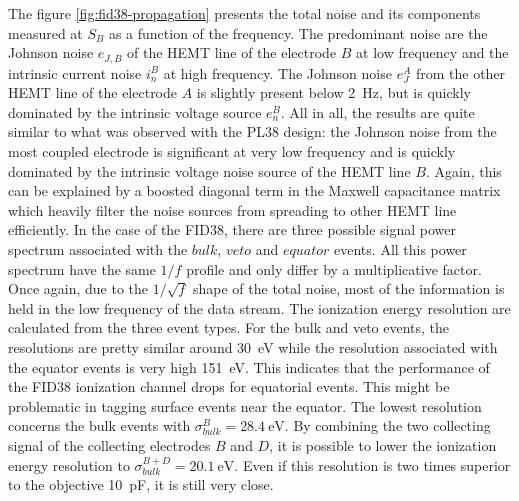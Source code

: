 The figure \ref{fig:fid38-propagation} presents the total noise and its components measured at $S_B$ as a function of the frequency. The predominant noise are the Johnson noise $e_{J,B}$ of the HEMT line of the electrode $B$ at low frequency and the intrinsic current noise $i_n^B$ at high frequency. The Johnson noise $e_J^A$ from the other HEMT line of the electrode $A$ is slightly present below \SI{2}{\Hz}, but is quickly dominated by the intrinsic voltage source $e_n^B$. All in all, the results are quite similar to what was observed with the PL38 design: the Johnson noise from the most coupled electrode is significant at very low frequency and is quickly dominated by the intrinsic voltage noise source of the HEMT line $B$. Again, this can be explained by a boosted diagonal term in the Maxwell capacitance matrix which heavily filter the noise sources from spreading to other HEMT line efficiently.
In the case of the FID38, there are three possible signal power spectrum associated with the $bulk$, $veto$ and $equator$ events. All this power spectrum have the same $1/f$ profile and only differ by a multiplicative factor.
Once again, due to the $1/\sqrt{f}$ shape of the total noise, most of the information is held in the low frequency of the data stream. The ionization energy resolution are calculated from the three event types. For the bulk and veto events, the resolutions are pretty similar around \SI{30}{\eV} while the resolution associated with the equator events is very high \SI{151}{\eV}. This indicates that the performance of the FID38 ionization channel drops for equatorial events. This might be problematic in tagging surface events near the equator. The lowest resolution concerns the bulk events with $\sigma_{bulk}^B = \SI{28.4}{\eV}$. By combining the two collecting signal of the collecting electrodes $B$ and $D$, it is possible to lower the ionization energy resolution to  $\sigma_{bulk}^{B+D} = \SI{20.1}{\eV}$. Even if this resolution is two times superior to the objective \SI{10}{\pico\farad}, it is still very close.

